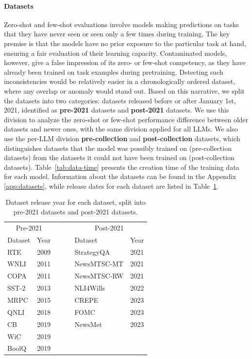 \documentclass[letterpaper]{article} %
\newcommand{\jmf}[1]{}      %
\begin{document}
\paragraph{Datasets}
\jmf{update and expand}
Zero-shot and few-shot evaluations involve models making predictions on tasks that they have never seen or seen only a few times during training. The key premise is that the models have no prior exposure to the particular task at hand, ensuring a fair evaluation of their learning capacity. Contaminated models, however, give a false impression of its zero- or few-shot competency, as they have already been trained on task examples during pretraining. Detecting such inconsistencies would be relatively easier in a chronologically ordered dataset, where any overlap or anomaly would stand out. Based on this narrative, we split the datasets into two categories:
datasets released before or after January 1st, 2021, identified as \textbf{pre-2021} datasets and \textbf{post-2021} datasets. We use this division to analyze the zero-shot or few-shot performance difference between older datasets and newer ones, with the same division applied for all LLMs. We also use the per-LLM division \textbf{pre-collection} and \textbf{post-collection} datasets, which distinguishes datasets that the model was possibly trained on (pre-collection datasets) from the datasets it could not have been trained on (post-collection datasets). Table~\ref{tab:data-time} presents the creation time of the training data for each model. Information about the datasets can be found in the Appendix \ref{app:datasets}, while release dates for each dataset are listed in Table~\ref{table:datasets}.

\begin{table}[htpb!]
\centering
\begin{tabular}{lllll}

\toprule
\multicolumn{2}{c}{Pre-2021} &  & \multicolumn{2}{c}{Post-2021} \\
     Dataset     &     Year     & ~~~ &     Dataset      &        Year  \\
     \cmidrule{1-2} \cmidrule{4-5}
     RTE     &    2009      &  &StrategyQA &  2021 \\
     WNLI     &   2011       &  &NewsMTSC-MT & 2021 \\
     COPA & 2011 &  & NewsMTSC-RW & 2021\\
     SST-2 & 2013&    & NLI4Wills & 2022 \\
     MRPC & 2015  &   & CREPE & 2023\\
     QNLI & 2018 &  & FOMC & 2023 \\
     CB &  2019&   &  NewsMet & 2023 \\
     WiC & 2019&   & \multicolumn{2}{c}{}\\
     BoolQ &  2019&  \\
\bottomrule
\end{tabular}
\caption{Dataset release year for each dataset, split into pre-2021 datasets and post-2021 datasets. }
\label{table:datasets}
\end{table}
\end{document}
